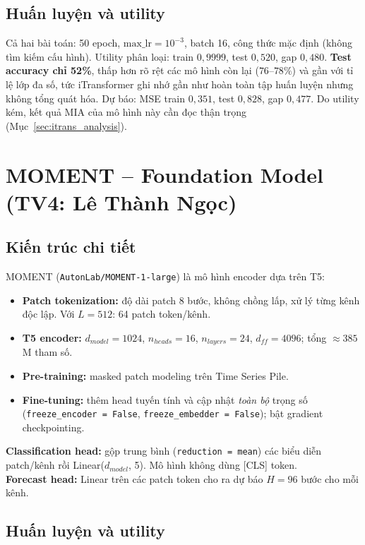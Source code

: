 \documentclass[12pt,a4paper]{report}
\begin{document}
\subsection{Huấn luyện và utility}

Cả hai bài toán: 50 epoch, $\text{max\_lr} = 10^{-3}$, batch 16, công thức mặc định (không tìm kiếm cấu hình). Utility phân loại: train $0{,}9999$, test $0{,}520$, gap $0{,}480$. \textbf{Test accuracy chỉ 52\%}, thấp hơn rõ rệt các mô hình còn lại ($76$--$78\%$) và gần với tỉ lệ lớp đa số, tức iTransformer ghi nhớ gần như hoàn toàn tập huấn luyện nhưng không tổng quát hóa. Dự báo: MSE train $0{,}351$, test $0{,}828$, gap $0{,}477$. Do utility kém, kết quả MIA của mô hình này cần đọc thận trọng (Mục~\ref{sec:itrans_analysis}).

\section{MOMENT -- Foundation Model (TV4: Lê Thành Ngọc)}

\subsection{Kiến trúc chi tiết}

MOMENT (\texttt{AutonLab/MOMENT-1-large}) \cite{goswami2024} là mô hình encoder dựa trên T5:
\begin{itemize}
  \item \textbf{Patch tokenization:} độ dài patch 8 bước, không chồng lấp, xử lý từng kênh độc lập. Với $L = 512$: 64 patch token/kênh.
  \item \textbf{T5 encoder:} $d_{model} = 1024$, $n_{heads} = 16$, $n_{layers} = 24$, $d_{ff} = 4096$; tổng $\approx 385$M tham số.
  \item \textbf{Pre-training:} masked patch modeling trên Time Series Pile.
  \item \textbf{Fine-tuning:} thêm head tuyến tính và cập nhật \textit{toàn bộ} trọng số (\texttt{freeze\_encoder = False}, \texttt{freeze\_embedder = False}); bật gradient checkpointing.
\end{itemize}
\textbf{Classification head:} gộp trung bình (\texttt{reduction = mean}) các biểu diễn patch/kênh rồi Linear($d_{model}$, 5). Mô hình không dùng [CLS] token.\\
\textbf{Forecast head:} Linear trên các patch token cho ra dự báo $H = 96$ bước cho mỗi kênh.

\subsection{Huấn luyện và utility}
\end{document}
